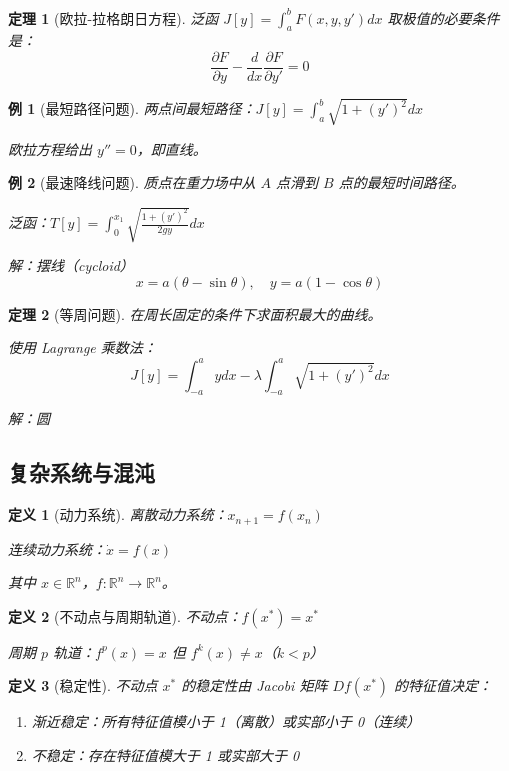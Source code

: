 \documentclass[12pt]{article}
\newtheorem{theorem}{定理}[section]
\newtheorem{definition}{定义}[section]
\newtheorem{example}{例}[section]
\begin{document}
\begin{theorem}[欧拉-拉格朗日方程]
泛函 $J[y] = \int_a^b F(x, y, y') dx$ 取极值的必要条件是：
$$\frac{\partial F}{\partial y} - \frac{d}{dx}\frac{\partial F}{\partial y'} = 0$$
\end{theorem}

\begin{example}[最短路径问题]
两点间最短路径：$J[y] = \int_a^b \sqrt{1 + (y')^2} dx$

欧拉方程给出 $y'' = 0$，即直线。
\end{example}

\begin{example}[最速降线问题]
质点在重力场中从 $A$ 点滑到 $B$ 点的最短时间路径。

泛函：$T[y] = \int_0^{x_1} \sqrt{\frac{1 + (y')^2}{2gy}} dx$

解：摆线（cycloid）
$$x = a(\theta - \sin\theta), \quad y = a(1 - \cos\theta)$$
\end{example}

\begin{theorem}[等周问题]
在周长固定的条件下求面积最大的曲线。

使用 Lagrange 乘数法：
$$J[y] = \int_{-a}^{a} y dx - \lambda \int_{-a}^{a} \sqrt{1 + (y')^2} dx$$

解：圆
\end{theorem}

\subsection{复杂系统与混沌}

\begin{definition}[动力系统]
离散动力系统：$x_{n+1} = f(x_n)$

连续动力系统：$\dot{x} = f(x)$

其中 $x \in \mathbb{R}^n$，$f: \mathbb{R}^n \to \mathbb{R}^n$。
\end{definition}

\begin{definition}[不动点与周期轨道]
不动点：$f(x^*) = x^*$

周期 $p$ 轨道：$f^p(x) = x$ 但 $f^k(x) \neq x$（$k < p$）
\end{definition}

\begin{definition}[稳定性]
不动点 $x^*$ 的稳定性由 Jacobi 矩阵 $Df(x^*)$ 的特征值决定：
\begin{enumerate}
\item 渐近稳定：所有特征值模小于 1（离散）或实部小于 0（连续）
\item 不稳定：存在特征值模大于 1 或实部大于 0
\end{enumerate}
\end{definition}
\end{document}
